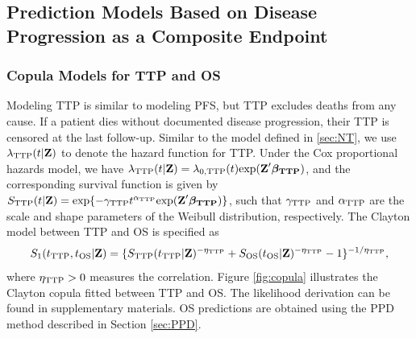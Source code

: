 \documentclass[aoas]{imsart}
\theoremstyle{plain}
\theoremstyle{remark}
\begin{document}
\subsection{Prediction Models Based on Disease Progression as a Composite Endpoint}

\subsubsection{Copula Models for TTP and OS}
\label{sec:method_copula}
Modeling TTP is similar to modeling PFS, but TTP excludes deaths from any cause. If a patient dies without documented disease progression, their TTP is censored at the last follow-up. Similar to the model defined in  \ref{sec:NT}, we use $\lambda_{\rm TTP}(t|\textbf{Z})$ to
denote the hazard function for TTP. Under the Cox
proportional hazards model, we have $\lambda_{\rm TTP}(t|\textbf{Z})=\lambda_{0, \rm TTP}(t)\mathrm{exp}(\textbf{Z}' \boldsymbol{\beta_{\rm TTP}})$, and the corresponding survival function is given by
$S_{\rm TTP}(t|\textbf{Z})=\mathrm{exp}\{-\gamma_{\rm TTP} t^{\alpha_{\rm TTP}}
\mathrm{exp}(\textbf{Z}' \boldsymbol{\beta_{\rm TTP}} )\}$, such that $\gamma_{\rm TTP}$ and $\alpha_{\rm TTP}$ are the scale and shape parameters
of the Weibull distribution, respectively. The Clayton model between TTP and OS is specified as
\begin{equation*}
S_1(t_{\rm TTP},
t_{\rm OS}|\textbf{Z})=\{S_{\rm TTP}(t_{\rm TTP}|\textbf{Z})^{-\eta_{\rm TTP}}
+S_{\rm OS}(t_{\rm OS}|\textbf{Z})^{-\eta_{\rm TTP}}-1\}^{-1/\eta_{\rm TTP}}, 
\end{equation*}
where $\eta_{\rm TTP}>0$ measures the correlation. Figure \ref{fig:copula} illustrates the Clayton copula fitted between TTP and OS.
The likelihood derivation can be found in supplementary materials. OS predictions are obtained using the PPD method described in Section \ref{sec:PPD}.
\end{document}
